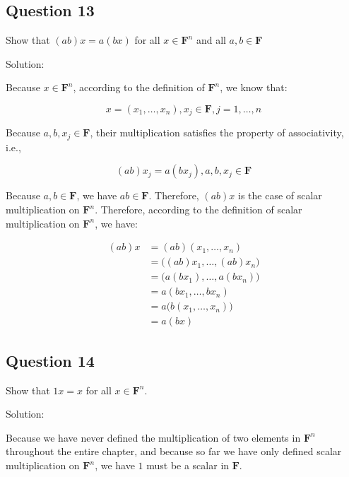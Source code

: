 \documentclass[12pt, letterpaper, oneside]{book}
\begin{document}
\subsection{Question 13}

Show that $(ab)x = a(bx)$ for all $x \in \mathbf{F}^n$ and all $a, b \in
\mathbf{F}$

Solution:

Because $x \in \mathbf{F}^n$, according to the definition of $\mathbf{F}^n$, we
know that:

\[ x = (x_1, \ldots, x_n), x_j \in \mathbf{F}, j = 1, \ldots, n \]

Because $a, b, x_j \in \mathbf{F}$, their multiplication satisfies the property
of associativity, i.e.,

\[ (ab)x_j = a(b x_j), a, b, x_j \in \mathbf{F} \]

Because $a, b \in \mathbf{F}$, we have $ab \in \mathbf{F}$. Therefore, $(ab)x$
is the case of scalar multiplication on $\mathbf{F}^n$. Therefore, according to
the definition of scalar multiplication on $\mathbf{F}^n$, we have:

\begin{equation*}
  \begin{split}
    (ab)x
    & = (ab)(x_1, \ldots, x_n) \\
    & = \bigl((ab)x_1, \ldots, (ab)x_n\bigr) \\
    & = \bigl(a(b x_1), \ldots, a(b x_n)\bigr) \\
    & = a(b x_1, \ldots, b x_n) \\
    & = a\bigl(b(x_1, \ldots, x_n)\bigr) \\
    & = a(bx)
  \end{split}
\end{equation*}

\subsection{Question 14}

Show that $1x = x$ for all $x \in \mathbf{F}^n$.

Solution:

Because we have never defined the multiplication of two elements in
$\mathbf{F}^n$ throughout the entire chapter, and because so far we have only
defined scalar multiplication on $\mathbf{F}^n$, we have $1$ must be a scalar
in $\mathbf{F}$.
\end{document}
